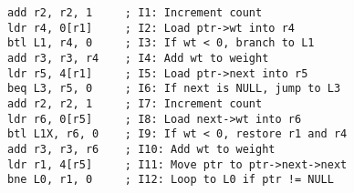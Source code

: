 \begin{lstlisting}[style=AsmStyle]
add r2, r2, 1     ; I1: Increment count
ldr r4, 0[r1]     ; I2: Load ptr->wt into r4
btl L1, r4, 0     ; I3: If wt < 0, branch to L1
add r3, r3, r4    ; I4: Add wt to weight
ldr r5, 4[r1]     ; I5: Load ptr->next into r5
beq L3, r5, 0     ; I6: If next is NULL, jump to L3
add r2, r2, 1     ; I7: Increment count
ldr r6, 0[r5]     ; I8: Load next->wt into r6
btl L1X, r6, 0    ; I9: If wt < 0, restore r1 and r4 
add r3, r3, r6    ; I10: Add wt to weight
ldr r1, 4[r5]     ; I11: Move ptr to ptr->next->next
bne L0, r1, 0     ; I12: Loop to L0 if ptr != NULL
\end{lstlisting}








